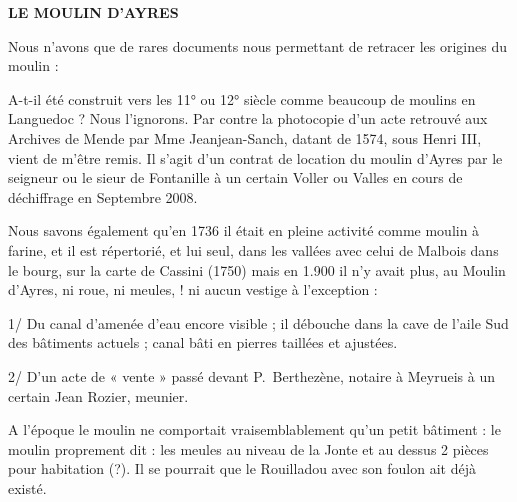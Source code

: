 
\begin{center}
    {\Large\bfseries LE MOULIN D’AYRES}
\end{center}

\vspace{0.55cm}

Nous n’avons que de rares documents nous permettant de retracer les origines du moulin :

\vspace{0.35cm}

A-t-il été construit vers les 11° ou 12° siècle comme beaucoup de moulins en Languedoc ?
Nous l’ignorons. Par contre la photocopie d’un acte retrouvé aux Archives de Mende par
Mme Jeanjean-Sanch, datant de 1574, sous Henri III, vient de m’être remis. Il s’agit d’un
contrat de location du moulin d’Ayres par le seigneur ou le sieur de Fontanille à un certain
Voller ou Valles en cours de déchiffrage en Septembre 2008.

\vspace{0.35cm}

Nous savons également qu’en 1736 il était en pleine activité comme moulin à farine, et il est
répertorié, et lui seul, dans les vallées avec celui de Malbois dans le bourg, sur la carte de
Cassini (1750) mais en 1.900 il n’y avait plus, au Moulin d’Ayres, ni roue, ni meules, !
ni aucun vestige à l’exception :

\vspace{0.3cm}

1/ Du canal d’amenée d’eau encore visible ; il débouche dans la cave de l’aile Sud des
bâtiments actuels ; canal bâti en pierres taillées et ajustées.

\vspace{0.3cm}

2/ D’un acte de « vente » passé devant P.~Berthezène, notaire à Meyrueis à un certain Jean
Rozier, meunier.

\vspace{0.35cm}

A l’époque le moulin ne comportait vraisemblablement qu’un petit bâtiment : le moulin
proprement dit : les meules au niveau de la Jonte et au dessus 2 pièces pour habitation (?).
Il se pourrait que le Rouilladou avec son foulon ait déjà existé.

\vspace{0.35cm}

